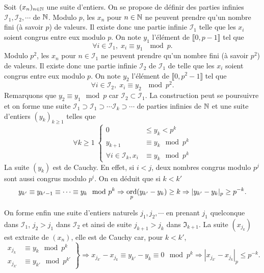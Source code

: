 \begin{demo}
Soit $(x_n)_{n \in \mathbb{N}}$ une suite d'entiers. On se propose de définir des parties infinies $\mathcal{I}_1, \mathcal{I}_2, \cdots $ de $\mathbb{N}$.\newline
Modulo $p$, les $x_n$ pour $n\in \mathbb{N}$ ne peuvent prendre qu'un nombre fini (à savoir $p$) de valeurs. Il existe donc une partie infinie $\mathcal{I}_1$ telle que les $x_i$ soient congrus entre eux modulo $p$. On note $y_1$ l'élément de $\llbracket 0, p-1 \rrbracket$ tel que
\begin{displaymath}
 \forall i \in \mathcal{I}_1, \; x_i \equiv y_1 \;\mod p.
\end{displaymath}
Modulo $p^2$, les $x_n$ pour $n\in \mathcal{I}_1$ ne peuvent prendre qu'un nombre fini (à savoir $p^2$) de valeurs. Il existe donc une partie infinie $\mathcal{I}_2$ de $\mathcal{I}_1$ de telle que les $x_i$ soient congrus entre eux modulo $p$. On note $y_2$ l'élément de $\llbracket 0, p^2-1 \rrbracket$ tel que
\begin{displaymath}
 \forall i \in \mathcal{I}_2, \; x_i \equiv y_2 \;\mod p^2.
\end{displaymath}
Remarquons que $y_2 \equiv y_1 \mod p$ car $\mathcal{I}_2 \subset \mathcal{I}_1$.\newline
La construction peut se poursuivre et on forme une suite $\mathcal{I}_1 \supset \mathcal{I}_1 \supset \cdots \mathcal{I}_k \supset  \cdots$ de parties infinies de $\mathbb{N}$ et une suite d'entiers $(y_k)_{k\geq 1}$ telles que
\begin{displaymath}
\forall k \geq 1 \;
\left\lbrace
 \begin{aligned}
    0 &\leq y_k < p^k \\
   y_{k+1} &\equiv y_k \mod  p^k \\
   \forall i \in \mathcal{I}_k, x_i &\equiv y_k \mod  p^k
 \end{aligned}
 \right.
\end{displaymath}
La suite $(y_k)$ est de Cauchy. En effet, si $i<j$, deux nombres congrus modulo $p^j$ sont aussi congrus modulo $p^i$. On en déduit que si $k < k'$
\begin{displaymath}
 y_{k'} \equiv y_{k'-1} \equiv \cdots \equiv y_k \mod p^k
 \Rightarrow \mathop{\mathrm{ord}}_p (y_{k'} - y_k) \geq k \Rightarrow | y_{k'} - y_k|_p \geq p^{-k}.
\end{displaymath}

On forme enfin une suite d'entiers naturels $j_1, j_2, \cdots$ en prenant $j_1$ quelconque dans $\mathcal{I}_1$, $j_2 >j_1$ dans $\mathcal{I}_2$ et ainsi de suite $j_{k+1} > j_k$ dans $\mathfrak{I}_{k+1}$. La suite $(x_{j_k})$ est extraite de $(x_n)$, elle est de Cauchy car, pour $k < k'$,
\begin{displaymath}
 \left.
 \begin{aligned}
   x_{j_k} &\equiv y_k \mod p^k \\
   x_{j_{k'}} &\equiv y_{k'} \mod p^{k'}
 \end{aligned}
 \right\rbrace
 \Rightarrow
 x_{j_{k'}} - x_{j_{k}} \equiv y_{k'} -y_k \equiv 0 \mod p^k
 \Rightarrow
 |x_{j_{k'}} - x_{j_{k}} |_p \leq p^{-k}.
\end{displaymath}
\end{demo}


